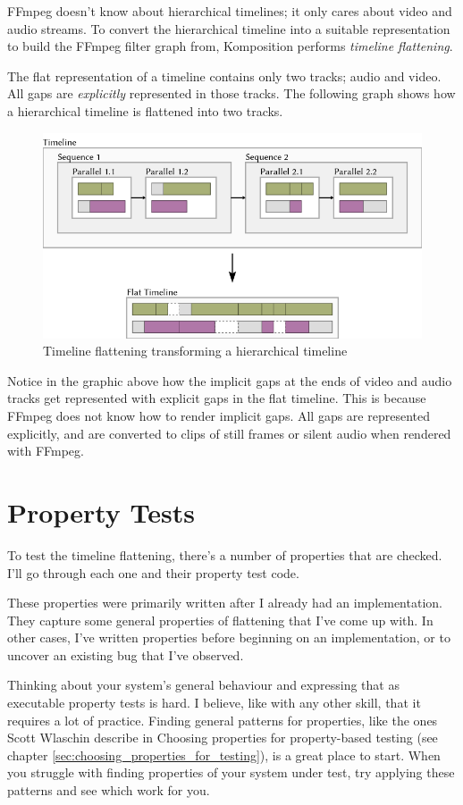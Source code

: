 FFmpeg doesn't know about hierarchical timelines; it only cares about video and audio streams. To convert the hierarchical timeline into a suitable representation to build the FFmpeg filter graph from, Komposition performs \textit{timeline flattening}.

The flat representation of a timeline contains only two tracks; audio and video. All gaps are \textit{explicitly} represented in those tracks. The following graph shows how a hierarchical timeline is flattened into two tracks.
\begin{figure}[htbp]
 \centering
 \includegraphics[width=.95\linewidth]{./pics/case1_6.png}
 \caption{Timeline flattening transforming a hierarchical timeline}
 \label{fig:case1_6}
\end{figure}
Notice in the graphic above how the implicit gaps at the ends of video and audio tracks get represented with explicit gaps in the flat timeline. This is because FFmpeg does not know how to render implicit gaps. All gaps are represented explicitly, and are converted to clips of still frames or silent audio when rendered with FFmpeg.

\section{Property Tests}


To test the timeline flattening, there's a number of properties that are checked. I'll go through each one and their property test code.

These properties were primarily written after I already had an implementation. They capture some general properties of flattening that I've come up with. In other cases, I've written properties before beginning on an implementation, or to uncover an existing bug that I've observed.

Thinking about your system's general behaviour and expressing that as executable property tests is hard. I believe, like with any other skill, that it requires a lot of practice. Finding general patterns for properties, like the ones Scott Wlaschin describe in Choosing properties for property-based testing (see chapter \ref{sec:choosing_properties_for_testing}), is a great place to start. When you struggle with finding properties of your system under test, try applying these patterns and see which work for you.



